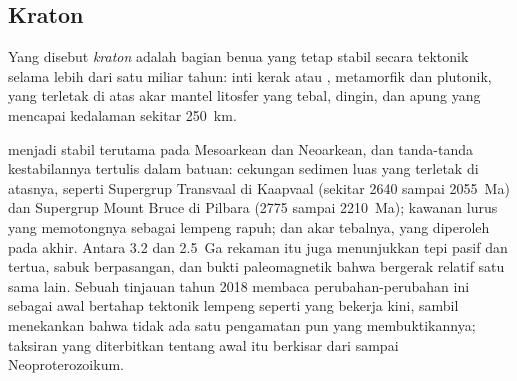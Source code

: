\subsection*{Kraton}

\begin{definition}[Kraton]\label{def:b2:precambrian-earth:craton}
Yang disebut \emph{kraton} adalah bagian benua yang tetap stabil secara tektonik
selama lebih dari satu miliar tahun: inti kerak  atau , metamorfik dan
plutonik, yang terletak di atas akar mantel litosfer yang tebal, dingin, dan apung yang mencapai kedalaman sekitar
\qty{250}{km}.
\end{definition}

 menjadi stabil terutama pada Mesoarkean dan Neoarkean, dan tanda-tanda
kestabilannya tertulis dalam batuan: cekungan sedimen luas yang terletak di atasnya, seperti
Supergrup Transvaal di  Kaapvaal (sekitar 2640 sampai \qty{2055}{Ma}) dan Supergrup Mount Bruce
di Pilbara (2775 sampai \qty{2210}{Ma}); kawanan  lurus yang memotongnya sebagai
lempeng rapuh; dan akar tebalnya, yang diperoleh pada  akhir. Antara 3.2 dan
\qty{2.5}{Ga} rekaman itu juga menunjukkan tepi pasif dan  tertua, sabuk
 berpasangan, dan bukti paleomagnetik bahwa  bergerak relatif satu sama lain.
Sebuah tinjauan tahun 2018 membaca perubahan-perubahan ini sebagai awal bertahap tektonik lempeng seperti yang bekerja
kini, sambil menekankan bahwa tidak ada satu pengamatan pun yang membuktikannya; taksiran yang diterbitkan tentang awal
itu berkisar dari  sampai Neoproterozoikum.

